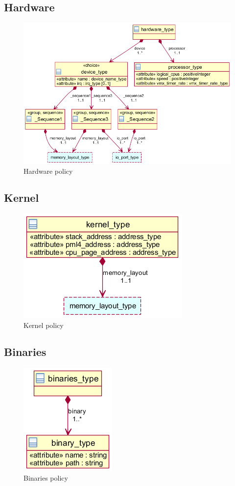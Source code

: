 \subsection{Hardware}
\label{subsec:hardware}
\begin{figure}[h]
	\centering
	\includegraphics[width=\textwidth]{images/xml_hardware.png}
	\caption{Hardware policy}
\end{figure}


\subsection{Kernel}
\begin{figure}[h]
	\centering
	\includegraphics[scale=0.6]{images/xml_kernel.png}
	\caption{Kernel policy}
\end{figure}


\subsection{Binaries}
\begin{figure}[h]
	\centering
	\includegraphics[scale=0.6]{images/xml_binary.png}
	\caption{Binaries policy}
\end{figure}


